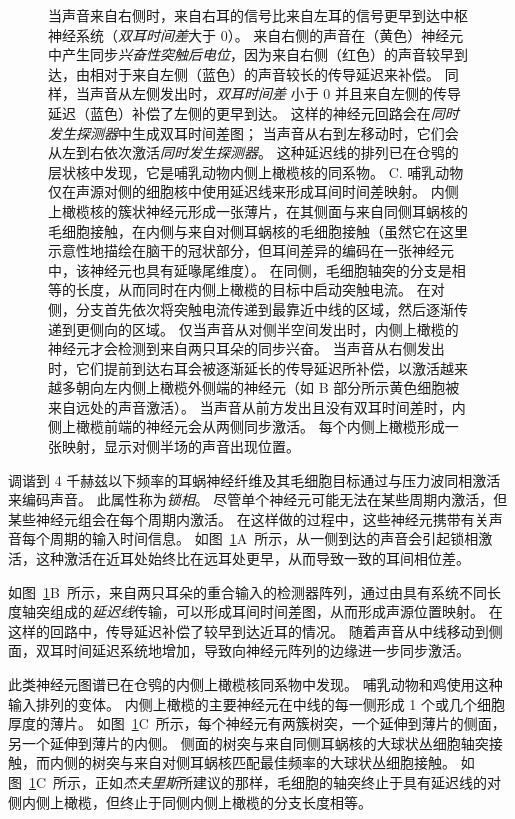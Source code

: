 \begin{figure}[htbp]
{		当声音来自右侧时，来自右耳的信号比来自左耳的信号更早到达中枢神经系统（\textit{双耳时间差}大于 0）。
		来自右侧的声音在（黄色）神经元中产生同步\textit{兴奋性突触后电位}，因为来自右侧（红色）的声音较早到达，由相对于来自左侧（蓝色）的声音较长的传导延迟来补偿。
		同样，当声音从左侧发出时，\textit{双耳时间差} 小于 0 并且来自左侧的传导延迟（蓝色）补偿了左侧的更早到达。
		这样的神经元回路会在\textit{同时发生探测器}中生成双耳时间差图；
		当声音从右到左移动时，它们会从左到右依次激活\textit{同时发生探测器}。
		这种延迟线的排列已在仓鸮的层状核中发现，它是哺乳动物内侧上橄榄核的同系物。
		C. 哺乳动物仅在声源对侧的细胞核中使用延迟线来形成耳间时间差映射。
		内侧上橄榄核的簇状神经元形成一张薄片，在其侧面与来自同侧耳蜗核的毛细胞接触，在内侧与来自对侧耳蜗核的毛细胞接触（虽然它在这里示意性地描绘在脑干的冠状部分，但耳间差异的编码在一张神经元中，该神经元也具有延喙尾维度）。
		在同侧，毛细胞轴突的分支是相等的长度，从而同时在内侧上橄榄的目标中启动突触电流。
		在对侧，分支首先依次将突触电流传递到最靠近中线的区域，然后逐渐传递到更侧向的区域。
		仅当声音从对侧半空间发出时，内侧上橄榄的神经元才会检测到来自两只耳朵的同步兴奋。
		当声音从右侧发出时，它们提前到达右耳会被逐渐延长的传导延迟所补偿，以激活越来越多朝向左内侧上橄榄外侧端的神经元（如 B 部分所示黄色细胞被来自远处的声音激活）。
		当声音从前方发出且没有双耳时间差时，内侧上橄榄前端的神经元会从两侧同步激活。
		每个内侧上橄榄形成一张映射，显示对侧半场的声音出现位置\cite{yin2002neural}。}
	\label{fig:28_5}
\end{figure}


调谐到 4 千赫兹以下频率的耳蜗神经纤维及其毛细胞目标通过与压力波同相激活来编码声音。
此属性称为\textit{锁相}。
尽管单个神经元可能无法在某些周期内激活，但某些神经元组会在每个周期内激活。
在这样做的过程中，这些神经元携带有关声音每个周期的输入时间信息。 
如图~\ref{fig:28_5}A~所示，从一侧到达的声音会引起锁相激活，这种激活在近耳处始终比在远耳处更早，从而导致一致的耳间相位差。


如图~\ref{fig:28_5}B~所示，来自两只耳朵的重合输入的检测器阵列，通过由具有系统不同长度轴突组成的\textit{延迟线}传输，可以形成耳间时间差图，从而形成声源位置映射\cite{jeffress1948place}。
在这样的回路中，传导延迟补偿了较早到达近耳的情况。
随着声音从中线移动到侧面，双耳时间延迟系统地增加，导致向神经元阵列的边缘进一步同步激活。


此类神经元图谱已在仓鸮的内侧上橄榄核同系物中发现。
哺乳动物和鸡使用这种输入排列的变体。
内侧上橄榄的主要神经元在中线的每一侧形成 1 个或几个细胞厚度的薄片。
如图~\ref{fig:28_5}C~所示，每个神经元有两簇树突，一个延伸到薄片的侧面，另一个延伸到薄片的内侧。
侧面的树突与来自同侧耳蜗核的大球状丛细胞轴突接触，而内侧的树突与来自对侧耳蜗核匹配最佳频率的大球状丛细胞接触。
如图~\ref{fig:28_5}C~所示，正如\textit{杰夫里斯}所建议的那样，毛细胞的轴突终止于具有延迟线的对侧内侧上橄榄，但终止于同侧内侧上橄榄的分支长度相等。


